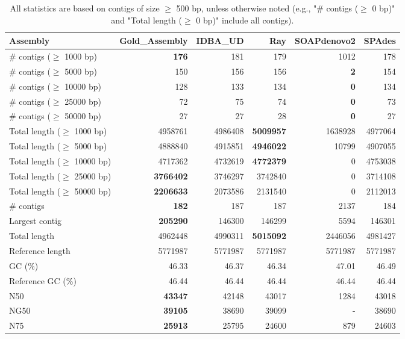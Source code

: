 \documentclass[12pt,a4paper]{article}
\begin{document}
\begin{table}[ht]
\begin{center}
\caption{All statistics are based on contigs of size $\geq$ 500 bp, unless otherwise noted (e.g., "\# contigs ($\geq$ 0 bp)" and "Total length ($\geq$ 0 bp)" include all contigs).}
\begin{tabular}{|l*{5}{|r}|}
\hline
Assembly & Gold\_Assembly & IDBA\_UD & Ray & SOAPdenovo2 & SPAdes \\ \hline
\# contigs ($\geq$ 1000 bp) & {\bf 176} & 181 & 179 & 1012 & 178 \\ \hline
\# contigs ($\geq$ 5000 bp) & 150 & 156 & 156 & {\bf 2} & 154 \\ \hline
\# contigs ($\geq$ 10000 bp) & 128 & 133 & 134 & {\bf 0} & 134 \\ \hline
\# contigs ($\geq$ 25000 bp) & 72 & 75 & 74 & {\bf 0} & 73 \\ \hline
\# contigs ($\geq$ 50000 bp) & 27 & 27 & 28 & {\bf 0} & 27 \\ \hline
Total length ($\geq$ 1000 bp) & 4958761 & 4986408 & {\bf 5009957} & 1638928 & 4977064 \\ \hline
Total length ($\geq$ 5000 bp) & 4888840 & 4915851 & {\bf 4946022} & 10799 & 4907055 \\ \hline
Total length ($\geq$ 10000 bp) & 4717362 & 4732619 & {\bf 4772379} & 0 & 4753038 \\ \hline
Total length ($\geq$ 25000 bp) & {\bf 3766402} & 3746297 & 3742840 & 0 & 3714108 \\ \hline
Total length ($\geq$ 50000 bp) & {\bf 2206633} & 2073586 & 2131540 & 0 & 2112013 \\ \hline
\# contigs & {\bf 182} & 187 & 187 & 2137 & 184 \\ \hline
Largest contig & {\bf 205290} & 146300 & 146299 & 5594 & 146301 \\ \hline
Total length & 4962448 & 4990311 & {\bf 5015092} & 2446056 & 4981427 \\ \hline
Reference length & 5771987 & 5771987 & 5771987 & 5771987 & 5771987 \\ \hline
GC (\%) & 46.33 & 46.37 & 46.34 & 47.01 & 46.49 \\ \hline
Reference GC (\%) & 46.44 & 46.44 & 46.44 & 46.44 & 46.44 \\ \hline
N50 & {\bf 43347} & 42148 & 43017 & 1284 & 43018 \\ \hline
NG50 & {\bf 39105} & 38690 & 39099 & - & 38690 \\ \hline
N75 & {\bf 25913} & 25795 & 24600 & 879 & 24603 \\ \hline

\end{tabular}
\end{center}
\end{table}
\end{document}
